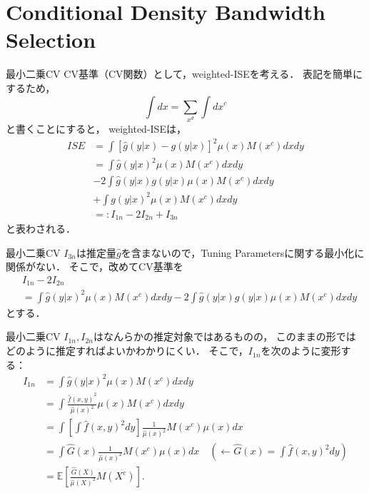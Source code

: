 \documentclass[xcolor=svgnames,dvipdfmx,cjk]{beamer}
\theoremstyle{example}
\begin{document}
\section{Conditional Density Bandwidth Selection}

\begin{frame}{最小二乗CV}
\quad 
CV基準（CV関数）として，weighted-ISEを考える．
表記を簡単にするため， 
\[\displaystyle \int dx = \sum_{x^d} \int dx^c\]
と書くことにすると，
weighted-ISEは，
\begin{align*}
  ISE &= \displaystyle \int \left[\hat{g}(y|x) - g(y|x)\right]^2 \mu(x)M(x^c)dxdy \\
      &=   \displaystyle \int \hat{g}(y|x)^2 \mu(x)M(x^c) dxdy \\
      &- 2 \displaystyle \int \hat{g}(y|x)g(y|x)\mu(x)M(x^c)dxdy \\
      &+   \displaystyle \int g(y|x)^2 \mu(x) M(x^c) dxdy \\
      &=: I_{1n} -2I_{2n}+I_{3n}
\end{align*}
と表わされる．  
\end{frame}

\begin{frame}{最小二乗CV}
\quad 
$I_{3n}$は推定量$\hat{g}$を含まないので，Tuning Parametersに関する最小化に関係がない．
そこで，改めてCV基準を
\begin{align*}
  & I_{1n} - 2 I_{2n} \\
  & =  \displaystyle \int \hat{g}(y|x)^2 \mu(x)M(x^c) dxdy 
    - 2 \displaystyle \int \hat{g}(y|x)g(y|x)\mu(x)M(x^c)dxdy 
\end{align*}
とする．
\end{frame}

\begin{frame}{最小二乗CV}
\quad 
$I_{1n}, I_{2n}$はなんらかの推定対象ではあるものの，
このままの形ではどのように推定すればよいかわかりにくい．
そこで，$I_{1n}$を次のように変形する：
\begin{align*}
    I_{1n} 
      &= \displaystyle \int \hat{g}(y|x)^2 \mu(x)M(x^c) dxdy \\
      &= \displaystyle \int \frac{{\hat{f}(x,y)}^2}{\hat{\mu}(x)^2}
         \mu(x)M(x^c) dxdy \\
      &= \int \left[ \int \hat{f}(x,y)^2 dy \right] 
         \frac{1}{\hat{\mu}(x)^2} M(x^c) \mu(x) dx \\
      &= \int \hat{G}(x) \frac{1}{\hat{\mu}(x)^2} M(x^c) \mu(x) dx 
         \quad \left(\leftarrow \hat{G}(x) = \int \hat{f}(x,y)^2 dy \right) \\
      &= \mathbb{E} \left[\frac{\hat{G}(X)}{\hat{\mu}(X)^2} M(X^c) \right].
\end{align*}
\end{frame}
\end{document}
